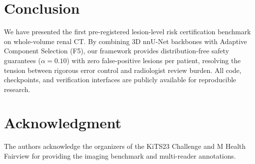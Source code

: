 \documentclass[journal,10pt,twocolumn]{IEEEtran}
\begin{document}
\section{Conclusion}
We have presented the first pre-registered lesion-level risk certification benchmark on whole-volume renal CT. By combining 3D nnU-Net backbones with Adaptive Component Selection (F5), our framework provides distribution-free safety guarantees ($\alpha = 0.10$) with zero false-positive lesions per patient, resolving the tension between rigorous error control and radiologist review burden. All code, checkpoints, and verification interfaces are publicly available for reproducible research.

\section*{Acknowledgment}
The authors acknowledge the organizers of the KiTS23 Challenge and M Health Fairview for providing the imaging benchmark and multi-reader annotations.



\end{document}
